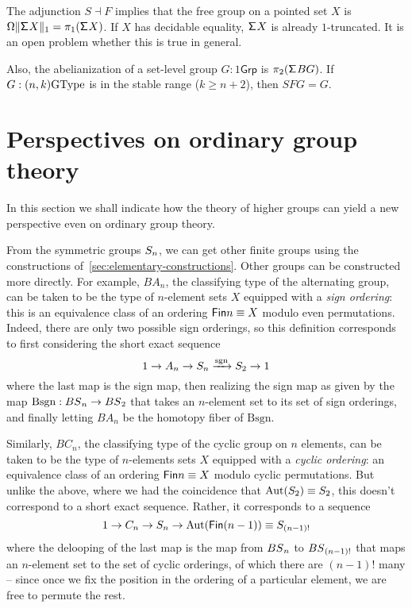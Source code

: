 The adjunction ${S} \dashv {F}$ implies that the free group on a
pointed set $X$ is $\Omega\trunc{1}{\susp X}=\pi_1(\susp X)$.  If $X$
has decidable equality, $\susp X$ is already $1$-truncated. It is an
open problem whether this is true in general.

Also, the abelianization of a set-level group $G : 1\mathsf{Grp}$ is
$\pi_2(\susp BG)$. If $G : (n,k)\GType$ is in the stable range ($k \ge
n+2$), then $SFG=G$.

\section{Perspectives on ordinary group theory}
\label{sec:perspectives}

In this section we shall indicate how the theory of higher groups can
yield a new perspective even on ordinary group theory.

From the symmetric groups $\Sym_n$, we can get other finite groups using
the constructions of~\cref{sec:elementary-constructions}. Other
groups can be constructed more directly. For example,
$BA_n$, the classifying type of the alternating group, can be taken to
be the type of $n$-element sets $X$ equipped with a \emph{sign
  ordering}: this is an equivalence class of an ordering
$\Fin n \equiv X$ modulo even permutations. Indeed, there are only two
possible sign orderings, so this definition corresponds to
first considering the short exact sequence
\[
  1 \to A_n \to \Sym_n \xrightarrow{\mathrm{sgn}}{} \Sym_2 \to 1
\]
where the last map is the sign map, then realizing the sign map
as given by the map $\mathrm{Bsgn} : \BS_n \to \BS_2$ that takes
an $n$-element set to its set of sign orderings, and finally
letting $BA_n$ be the homotopy fiber of $\mathrm{Bsgn}$.

Similarly, $BC_n$, the classifying type of the cyclic group on $n$
elements, can be taken to be the type of $n$-elements sets $X$
equipped with a \emph{cyclic ordering}: an equivalence class of an
ordering $\Fin n \equiv X$ modulo cyclic permutations. But unlike
the above, where we had the coincidence that $\Aut(\Sym_2) \equiv
\Sym_2$,
this doesn't correspond to a short exact sequence. Rather,
it corresponds to a sequence
\[
  1 \to C_n \to \Sym_n \to \Aut(\Fin(n-1)) \equiv \Sym_{(n-1)!}
\]
where the delooping of the last map is the map from $\BS_n$ to
$\BS_{(n-1)!}$ that maps an $n$-element set to the set of cyclic
orderings, of which there are $(n-1)!$ many -- since once we fix the
position in the ordering of a particular element,
we are free to permute the rest.

